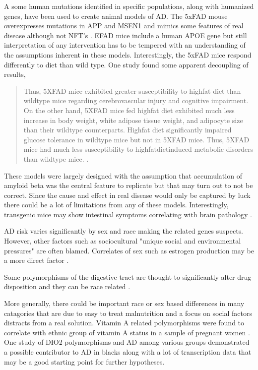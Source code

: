 {A some human mutations identified   in specific
populations, along with humanized genes,
 have been used to create animal models of AD. 
The 5xFAD mouse overexpresses mutations
in APP and MSEN1 and mimics some features of real disease
although not NFT's  \cite{PMC8346252}.
EFAD mice include a human APOE gene \cite{PMC5580905}
but still interpretation of any intervention has to be
tempered with an understanding of the assumptions inherent
in these models. 
Interestingly, the 5xFAD mice respond differently to diet than
wild type. One study found some apparent decoupling
of results,
\begin{quote}
Thus, 5XFAD mice exhibited greater susceptibility to highfat diet than wildtype
mice regarding cerebrovascular injury and cognitive impairment. On the other
hand, 5XFAD mice fed highfat diet exhibited much less increase in body weight,
white adipose tissue weight, and adipocyte size than their wildtype counterparts.
Highfat diet significantly impaired glucose tolerance in wildtype mice but
not in 5XFAD mice. Thus, 5XFAD mice had much less susceptibility to 
highfatdietinduced metabolic disorders than wildtype mice.
\cite{doi:10.1161/JAHA.115.003154}.
\end{quote}

These models were largely designed with the assumption that accumulation
of amyloid beta was the central feature to replicate but that
may turn out to not be correct. 
Since the cause and effect in real disease would only
be captured by luck there could be a lot of limitations
from any of these models.  
Interestingly, transgenic mice may show intestinal symptoms correlating with  
 brain pathology \cite{MANOCHA2019166}.

AD risk varies significantly by sex and race
\cite{Lim_Wang_Park_Risk_Alzheimer_2022}
 making the related genes suspects. 
However, other factors such as sociocultural
\cite{Franzen_Gilsanz_Li_Consideration_2022}
"unique social and environmental pressures"
\cite{MISIURA20231019} are often blamed.
Correlates of sex such as estrogen production
may be a more direct factor
\cite{Rahman_Jackson_Hristov_Gender_Driven_2019}.

Some polymorphisms of the digestive tract are thought
to significantly alter drug disposition and they
can be race related
\cite{Gao_Bell_Zhang_Racial_Disparity_Drug_2021}.

More generally, there could be important race or sex based
differences in many catagories that are due to easy
to treat malnutrition and a focus on social factors 
distracts from a real solution. Vitamin A related polymorphisms
were found to correlate with ethnic group of vitamin A status
in a sample of pregnant women
\cite{Suzuki_Wang_Garretto_Disproportionate_Vitamin_Deficiency_2021}.
One study of DIO2 polymorphisms and AD among various groups
demonstrated a possible contributor to AD in blacks
along with a lot of transcription data 
\cite{10.1210/jc.2017-01196} that may be a good starting point for
further hypotheses. 

}
